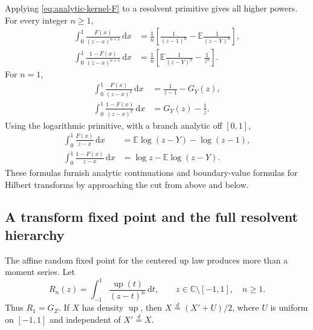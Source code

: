 \documentclass[11pt,oneside]{article}
\theoremstyle{definition}
\newcommand{\F}{F}
\newcommand{\upf}{\operatorname{up}}
\newcommand{\E}{\mathbb E}
\newcommand{\C}{\mathbb C}
\newcommand{\dd}{\,\mathrm d}
\begin{document}
Applying \cref{eq:analytic-kernel-F} to a resolvent primitive gives all higher powers.
For every integer \(n\ge1\),
\begin{align}
 \int_0^1\frac{\F(x)}{(z-x)^{n+1}}\dd x
 &=\frac1n\left[\frac1{(z-1)^n}-\E\frac1{(z-Y)^n}\right],
 \label{eq:resolvent-F-n}\\
 \int_0^1\frac{1-\F(x)}{(z-x)^{n+1}}\dd x
 &=\frac1n\left[\E\frac1{(z-Y)^n}-\frac1{z^n}\right].
 \label{eq:resolvent-up-n}
\end{align}
For \(n=1\),
\begin{align}
 \int_0^1\frac{\F(x)}{(z-x)^2}\dd x
 &=\frac1{z-1}-G_Y(z),\label{eq:resolvent-F-2}\\
 \int_0^1\frac{1-\F(x)}{(z-x)^2}\dd x
 &=G_Y(z)-\frac1z.\label{eq:resolvent-up-2}
\end{align}
Using the logarithmic primitive, with a branch analytic off \([0,1]\),
\begin{align}
 \int_0^1\frac{\F(x)}{z-x}\dd x
 &=\E\log(z-Y)-\log(z-1),
 \label{eq:log-resolvent-F}\\
 \int_0^1\frac{1-\F(x)}{z-x}\dd x
 &=\log z-\E\log(z-Y).
 \label{eq:log-resolvent-up}
\end{align}
These formulas furnish analytic continuations and boundary-value formulas for Hilbert
transforms by approaching the cut from above and below.

\subsection{A transform fixed point and the full resolvent hierarchy}
\label{subsec:resolvent-fixed-point}

The affine random fixed point for the centered up law produces more than a moment
series.  Let
\begin{equation}\label{eq:Rn-def}
 R_n(z)=\int_{-1}^1\frac{\upf(t)}{(z-t)^n}\dd t,
 \qquad z\in\C\setminus[-1,1],\quad n\ge1.
\end{equation}
Thus \(R_1=G_Z\).  If \(X\) has density \(\upf\), then
\(X\overset d=(X'+U)/2\), where \(U\) is uniform on \([-1,1]\) and independent of
\(X'\overset d=X\).
\end{document}
